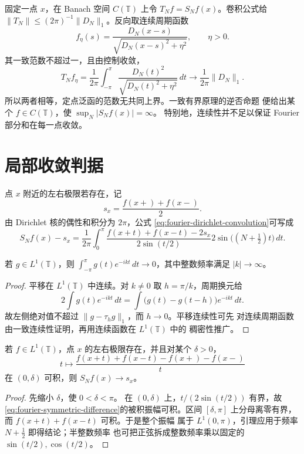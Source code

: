 固定一点 \(x\)，在 Banach 空间 \(C(\mathbb T)\) 上令
\(T_Nf=S_Nf(x)\)。卷积公式给
\(\|T_N\|\le(2\pi)^{-1}\|D_N\|_1\)。反向取连续周期函数
\[
 f_\eta(s)=\frac{D_N(x-s)}{\sqrt{D_N(x-s)^2+\eta^2}},\qquad \eta>0.
\]
其一致范数不超过一，且由控制收敛，
\[
 T_Nf_\eta=\frac1{2\pi}\int_{-\pi}^{\pi}
 \frac{D_N(t)^2}{\sqrt{D_N(t)^2+\eta^2}}\,dt
 \longrightarrow\frac1{2\pi}\|D_N\|_1.
\]
所以两者相等，定点泛函的范数无共同上界。一致有界原理的逆否命题
便给出某个 \(f\in C(\mathbb T)\)，使 \(\sup_N|S_Nf(x)|=\infty\)。
特别地，连续性并不足以保证 Fourier 部分和在每一点收敛。

\section{局部收敛判据}

点 \(x\) 附近的左右极限若存在，记
\[
 s_x=\frac{f(x+)+f(x-)}2.
\]
由 Dirichlet 核的偶性和积分为 \(2\pi\)，公式
\eqref{eq:fourier-dirichlet-convolution}可写成
\begin{equation}\label{eq:fourier-symmetric-difference}
 S_Nf(x)-s_x
 =\frac1{2\pi}\int_0^\pi
 \frac{f(x+t)+f(x-t)-2s_x}{2\sin(t/2)}
 2\sin\bigl((N+\tfrac12)t\bigr)\,dt.
\end{equation}

\begin{lemma}\label{lem:circle-riemann-lebesgue}
若 \(g\in L^1(\mathbb T)\)，则
\(\int_{-\pi}^{\pi}g(t)e^{-ikt}\,dt\to0\)，其中整数频率满足 \(|k|\to\infty\)。
\end{lemma}
\begin{proof}
平移在 \(L^1(\mathbb T)\) 中连续。对 \(k\ne0\) 取
\(h=\pi/k\)，周期换元给
\[
 2\int g(t)e^{-ikt}\,dt
 =\int\bigl(g(t)-g(t-h)\bigr)e^{-ikt}\,dt.
\]
故左侧绝对值不超过 \(\|g-\tau_hg\|_1\)，而 \(h\to0\)。平移连续性可先
对连续周期函数由一致连续性证明，再用连续函数在 \(L^1(\mathbb T)\) 中的
稠密性推广。
\end{proof}

\begin{theorem}[Dini 判据]\label{thm:fourier-dini-test}
若 \(f\in L^1(\mathbb T)\)，点 \(x\) 的左右极限存在，并且对某个
\(\delta>0\)，
\[
 t\longmapsto
 \frac{f(x+t)+f(x-t)-f(x+)-f(x-)}{t}
\]
在 \((0,\delta)\) 可积，则 \(S_Nf(x)\to s_x\)。
\end{theorem}
\begin{proof}
先缩小 \(\delta\)，使 \(0<\delta<\pi\)。
在 \((0,\delta)\) 上，\(t/(2\sin(t/2))\) 有界，故
\eqref{eq:fourier-symmetric-difference}的被积振幅可积。区间
\([\delta,\pi]\) 上分母离零有界，而 \(f(x+t)+f(x-t)\) 可积。于是整个振幅
属于 \(L^1(0,\pi)\)，引理应用于频率 \(N+\tfrac12\) 即得结论；半整数频率
也可把正弦拆成整数频率乘以固定的 \(\sin(t/2),\cos(t/2)\)。
\end{proof}

